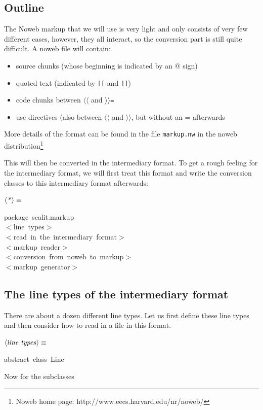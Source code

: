 \documentclass[a4paper,12pt]{article}
\begin{document}
\subsection{Outline}
The Noweb markup that we will use is very light and only consists of
very few different cases, however, they all interact, so the conversion
part is still quite difficult. A noweb file will contain:

\begin{itemize}
\item source chunks (whose beginning is indicated by an @ sign)
\item quoted text (indicated by \texttt{[[} and \texttt{]]})
\item code chunks between \texttt{$\langle$$\langle$} and \texttt{$\rangle$$\rangle$=}
\item use directives (also between \texttt{$\langle$$\langle$} and \texttt{$\rangle$$\rangle$}, but without an =
afterwards
\end{itemize}

More details of the format can be found in the file \texttt{markup.nw} in the
noweb distribution\footnote{Noweb home page: http://www.eecs.harvard.edu/nr/noweb/}

This will then be converted in the intermediary format. To get a rough feeling for
the intermediary format, we will first treat this format and write the conversion
classes to this intermediary format afterwards:

$\left<\mbox{\emph{*}}\right>\equiv$
\begin{program}{\vem package}~scalit.markup
\\[0.5em]$<$line~types$>$
\\[0.5em]$<$read~in~the~intermediary~format$>$
\\[0.5em]$<$markup~reader$>$
\\[0.5em]$<$conversion~from~noweb~to~markup$>$
\\[0.5em]$<$markup~generator$>$
\\[0.5em]\end{program}
\subsection{The line types of the intermediary format}
There are about a dozen different line types. Let us first define these
line types and then consider how to read in a file in this format.

$\left<\mbox{\emph{line types}}\right>\equiv$
\begin{program}{\vem abstract}~{\vem class}~Line
\\[0.5em]\end{program}
Now for the subclasses
\end{document}
